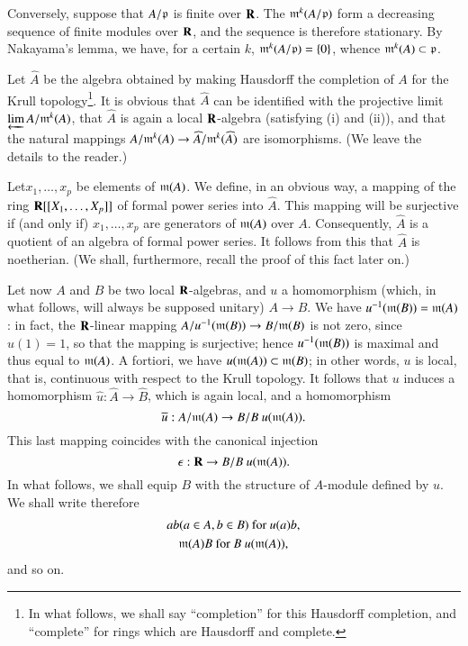 Conversely, suppose that $A/\mathfrak{p}$ is finite over $\mathbf{R}$. The $\mathfrak{m}^{k}(A/\mathfrak{p})$ form a decreasing sequence of finite modules over $\mathbf{R}$, and the sequence is therefore stationary. By Nakayama's lemma, we have, for a certain $k$, $\mathfrak{m}^{k}(A/\mathfrak{p})=\{0\}$, whence $\mathfrak{m}^{k}(A)\subset\mathfrak{p}$.

Let $\widehat{A}$ be the algebra obtained by making Hausdorff the completion of $A$ for the Krull topology\footnote[1]{In what follows, we shall say ``completion'' for this Hausdorff completion, and ``complete'' for rings which are Hausdorff and complete.}. It is obvious that $\widehat{A}$ can be identified with the projective limit $\varprojlim A/\mathfrak{m}^{k}(A)$, that $\widehat{A}$ is again a local $\mathbf{R}$-algebra (satisfying (i) and (ii)), and that the natural mappings $A/\mathfrak{m}^{k}(A)\to \widehat{A}/\mathfrak{m}^{k}(\widehat{A})$ are isomorphisms. (We leave the details to the reader.)

Let\pageoriginale $x_{1},\ldots,x_{p}$ be elements of $\mathfrak{m}(A)$. We define, in an obvious way, a mapping of the ring $\mathbf{R}[[X_{1},\ldots,X_{p}]]$ of formal power series into $\widehat{A}$. This mapping will be surjective if (and only if) $x_{1},\ldots,x_{p}$ are generators of $\mathfrak{m}(A)$ over $A$. Consequently, $\widehat{A}$ is a quotient of an algebra of formal power series. It follows from this that $\widehat{A}$ is noetherian. (We shall, furthermore, recall the proof of this fact later on.)

Let now $A$ and $B$ be two local $\mathbf{R}$-algebras, and $u$ a homomorphism (which, in what follows, will always be supposed unitary) $A\to B$. We have $u^{-1}(\mathfrak{m}(B))=\mathfrak{m}(A)$: in fact, the $\mathbf{R}$-linear mapping $A/u^{-1}(\mathfrak{m}(B))\to B/\mathfrak{m}(B)$ is not zero, since $u(1)=1$, so that the mapping is surjective; hence $u^{-1}(\mathfrak{m}(B))$ is maximal and thus equal to $\mathfrak{m}(A)$. A fortiori, we have $u(\mathfrak{m}(A))\subset \mathfrak{m}(B)$; in other words, $u$ is local, that is, continuous with respect to the Krull topology. It follows that $u$ induces a homomorphism $\widehat{u}:\widehat{A}\to \widehat{B}$, which is again local, and a homomorphism
$$
\overline{u}:A/\mathfrak{m}(A)\to B/B \ u (\mathfrak{m}(A)).
$$
This last mapping coincides with the canonical injection
$$
\epsilon:\bfR\to B/B \ u(\frakm(A)).
$$
In what follows, we shall equip $B$ with the structure of $A$-module defined by $u$. We shall write therefore
\begin{gather*}
ab(a\in A, b\in B)\text{ for } u(a)b,\\
\mathfrak{m}(A)B\text{ for } B \ u(\mathfrak{m}(A)),
\end{gather*}
and so on.

